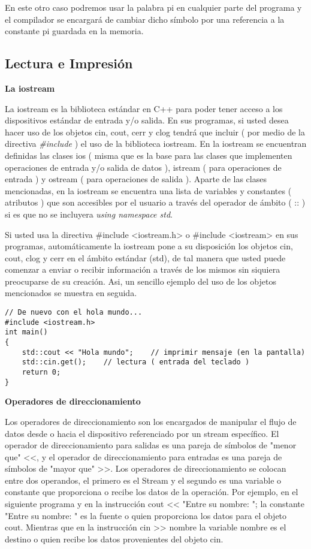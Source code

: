 En este otro caso podremos usar la palabra pi en cualquier parte del programa y el compilador se encargará
de cambiar dicho símbolo por una referencia a la constante pi guardada en la memoria.

\subsection{Lectura e Impresión}

\textbf{La iostream}

La iostream es la biblioteca estándar en C++ para poder tener acceso a los dispositivos estándar de entrada y/o salida. En sus programas, si usted desea hacer uso de los objetos cin, cout, cerr y clog tendrá que incluir ( por medio de la directiva \textit{\#include} ) el uso de la biblioteca iostream. En la iostream se encuentran definidas las clases ios ( misma que es la base para las clases que implementen operaciones de entrada y/o salida de datos ), istream ( para operaciones de entrada ) y ostream ( para operaciones de salida ). Aparte de las clases mencionadas, en la iostream se encuentra una lista de variables y constantes ( atributos ) que son accesibles por el usuario a través del operador de ámbito ( :: ) si es que no se incluyera \textit{using namespace std}.

Si usted usa la directiva \#include <iostream.h> o \#include <iostream> en sus programas, automáticamente la iostream pone a su disposición los objetos cin, cout, clog y cerr en el ámbito estándar (std), de tal manera que usted puede comenzar a enviar o recibir información a través de los mismos sin siquiera preocuparse de su creación. Asi, un sencillo ejemplo del uso de los objetos mencionados se muestra en seguida.

\begin{lstlisting}[style=Cpp, label=iostream, caption=Iostream]
// De nuevo con el hola mundo...
#include <iostream.h>
int main()
{
    std::cout << "Hola mundo";    // imprimir mensaje (en la pantalla)
    std::cin.get();    // lectura ( entrada del teclado )
    return 0;
}
\end{lstlisting}

\textbf{Operadores de direccionamiento}

Los operadores de direccionamiento son los encargados de manipular el flujo de datos desde o hacia el dispositivo referenciado por un stream específico. El operador de direccionamiento para salidas es una pareja de símbolos de "menor que" <<, y el operador de direccionamiento para entradas es una pareja de símbolos de "mayor que" >>. Los operadores de direccionamiento se colocan entre dos operandos, el primero es el Stream y el segundo es una variable o constante que proporciona o recibe los datos de la operación. Por ejemplo, en el siguiente programa y en la instrucción cout << "Entre su nombre: "; la constante "Entre su nombre: " es la fuente o quien proporciona los datos para el objeto cout. Mientras que en la instrucción cin >> nombre la variable nombre es el destino o quien recibe los datos provenientes del objeto cin.

